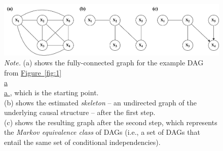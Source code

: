 \documentclass[11pt]{article}
\newcommand*{\figref}[2][]{%
  \hyperref[{fig:#2}]{%
    Figure~\ref*{fig:#2}%
    \ifx\\#1\\%
    \else
      #1%
    \fi
  }%
}
\begin{document}

\pagebreak
{}

\begin{figure}[H]
    \centering
        \caption{Steps of a constraint-based method.}
        \includegraphics[width=1.0\textwidth]{figures/constraintstep.png}
        \vspace{0.1mm}
        \caption*{\small{\textit{Note.} (a) shows the fully-connected graph for the example DAG from \figref[a]{1}, which is the starting point. \\(b) shows the estimated \textit{skeleton} -- an undirected graph of the underlying causal structure -- after the first step. \\(c) shows the resulting graph after the second step, which represents the \textit{Markov equivalence class} of DAGs (i.e., a set of DAGs that entail the same set of conditional independencies).}}
    \label{fig:2}
\end{figure}


\end{document}
